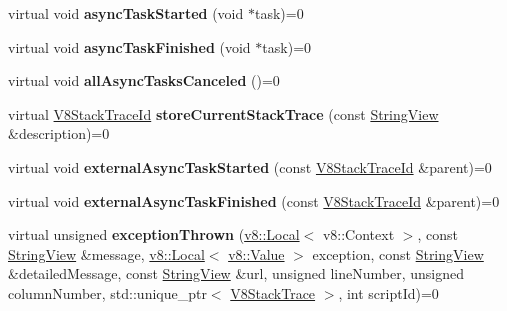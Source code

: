 \begin{DoxyCompactItemize}
\item 
\mbox{\label{classv8__inspector_1_1V8Inspector_a18081a671c17b6c8cc9e827e834518fc}} 
virtual void {\bfseries async\+Task\+Started} (void $\ast$task)=0
\item 
\mbox{\label{classv8__inspector_1_1V8Inspector_aa19d6664fb011102014395d54d16ed68}} 
virtual void {\bfseries async\+Task\+Finished} (void $\ast$task)=0
\item 
\mbox{\label{classv8__inspector_1_1V8Inspector_a2a92520981e6d348ae004c6c72098975}} 
virtual void {\bfseries all\+Async\+Tasks\+Canceled} ()=0
\item 
\mbox{\label{classv8__inspector_1_1V8Inspector_af9682cd0e499d0d5e628c619b5efc382}} 
virtual \mbox{\hyperlink{structv8__inspector_1_1V8StackTraceId}{V8\+Stack\+Trace\+Id}} {\bfseries store\+Current\+Stack\+Trace} (const \mbox{\hyperlink{classv8__inspector_1_1StringView}{String\+View}} \&description)=0
\item 
\mbox{\label{classv8__inspector_1_1V8Inspector_afd1530d80ad0a5a8bb284fc5aeb32fef}} 
virtual void {\bfseries external\+Async\+Task\+Started} (const \mbox{\hyperlink{structv8__inspector_1_1V8StackTraceId}{V8\+Stack\+Trace\+Id}} \&parent)=0
\item 
\mbox{\label{classv8__inspector_1_1V8Inspector_a0968e8e70a8c9086b66e421e02db8a5e}} 
virtual void {\bfseries external\+Async\+Task\+Finished} (const \mbox{\hyperlink{structv8__inspector_1_1V8StackTraceId}{V8\+Stack\+Trace\+Id}} \&parent)=0
\item 
\mbox{\label{classv8__inspector_1_1V8Inspector_a71e69c7b3fbb5eb9c0b5272f6aab3a2d}} 
virtual unsigned {\bfseries exception\+Thrown} (\mbox{\hyperlink{classv8_1_1Local}{v8\+::\+Local}}$<$ v8\+::\+Context $>$, const \mbox{\hyperlink{classv8__inspector_1_1StringView}{String\+View}} \&message, \mbox{\hyperlink{classv8_1_1Local}{v8\+::\+Local}}$<$ \mbox{\hyperlink{classv8_1_1Value}{v8\+::\+Value}} $>$ exception, const \mbox{\hyperlink{classv8__inspector_1_1StringView}{String\+View}} \&detailed\+Message, const \mbox{\hyperlink{classv8__inspector_1_1StringView}{String\+View}} \&url, unsigned line\+Number, unsigned column\+Number, std\+::unique\+\_\+ptr$<$ \mbox{\hyperlink{classv8__inspector_1_1V8StackTrace}{V8\+Stack\+Trace}} $>$, int script\+Id)=0

\end{DoxyCompactItemize}

